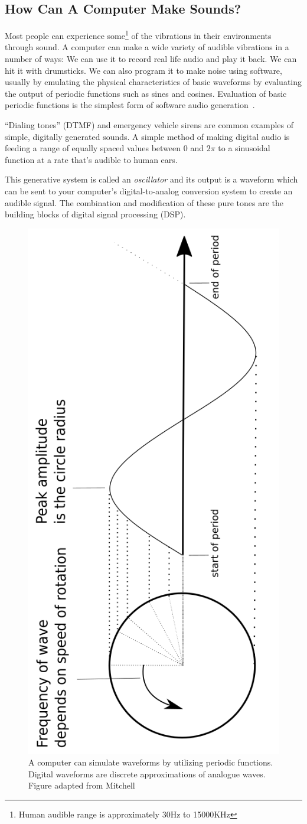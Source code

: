 \documentclass[\main/thesis.tex]{subfiles}
\begin{document}
\subsection{How Can A Computer Make Sounds?}
\label{sec:computer_make_sound}
Most people can experience some\footnote{Human audible range is approximately 30Hz to 15000KHz} of the vibrations in their environments through sound. A computer can make a wide variety of audible vibrations in a number of ways: We can use it to record real life audio and play it back. We can hit it with drumsticks. We can also program it to make noise using software, usually by emulating the physical characteristics of basic waveforms by evaluating the output of periodic functions such as sines and cosines. Evaluation of basic periodic functions is the simplest form of software audio generation~\cite{mitchell2009basicsynthChap5}.

\enquote{Dialing tones} (DTMF) and emergency vehicle sirens are common examples of simple, digitally generated sounds. A simple method of making digital audio is feeding a range of equally spaced values between 0 and $2\pi$ to a sinusoidal function at a rate that's audible to human ears. 

This generative system is called an \textit{oscillator} and its output is a waveform which can be sent to your computer's digital-to-analog conversion system to create an audible signal. The combination and modification of these pure tones are the building blocks of digital signal processing (DSP).


\begin{figure}[h]
\label{fig_example_sine}
\centering
\includegraphics[width=0.45\linewidth,angle =-90 ]{images/periodic_function.png}
\caption{A computer can simulate waveforms by utilizing periodic functions. Digital waveforms are discrete approximations of analogue waves. Figure adapted from Mitchell~\cite{mitchell2009basicsynthChap5} }
\end{figure}
\end{document}
